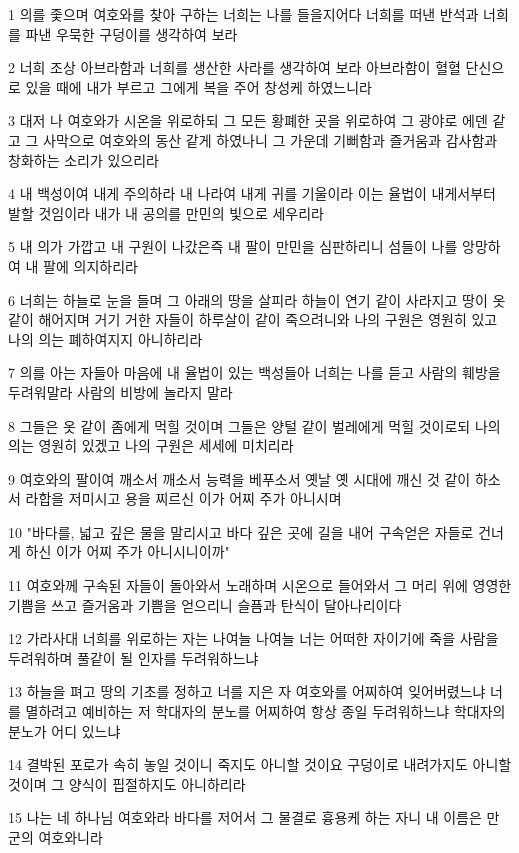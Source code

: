 \par 1 의를 좇으며 여호와를 찾아 구하는 너희는 나를 들을지어다 너희를 떠낸 반석과 너희를 파낸 우묵한 구덩이를 생각하여 보라
\par 2 너희 조상 아브라함과 너희를 생산한 사라를 생각하여 보라 아브라함이 혈혈 단신으로 있을 때에 내가 부르고 그에게 복을 주어 창성케 하였느니라
\par 3 대저 나 여호와가 시온을 위로하되 그 모든 황폐한 곳을 위로하여 그 광야로 에덴 같고 그 사막으로 여호와의 동산 같게 하였나니 그 가운데 기뻐함과 즐거움과 감사함과 창화하는 소리가 있으리라
\par 4 내 백성이여 내게 주의하라 내 나라여 내게 귀를 기울이라 이는 율법이 내게서부터 발할 것임이라 내가 내 공의를 만민의 빛으로 세우리라
\par 5 내 의가 가깝고 내 구원이 나갔은즉 내 팔이 만민을 심판하리니 섬들이 나를 앙망하여 내 팔에 의지하리라
\par 6 너희는 하늘로 눈을 들며 그 아래의 땅을 살피라 하늘이 연기 같이 사라지고 땅이 옷 같이 해어지며 거기 거한 자들이 하루살이 같이 죽으려니와 나의 구원은 영원히 있고 나의 의는 폐하여지지 아니하리라
\par 7 의를 아는 자들아 마음에 내 율법이 있는 백성들아 너희는 나를 듣고 사람의 훼방을 두려워말라 사람의 비방에 놀라지 말라
\par 8 그들은 옷 같이 좀에게 먹힐 것이며 그들은 양털 같이 벌레에게 먹힐 것이로되 나의 의는 영원히 있겠고 나의 구원은 세세에 미치리라
\par 9 여호와의 팔이여 깨소서 깨소서 능력을 베푸소서 옛날 옛 시대에 깨신 것 같이 하소서 라합을 저미시고 용을 찌르신 이가 어찌 주가 아니시며
\par 10 "바다를, 넓고 깊은 물을 말리시고 바다 깊은 곳에 길을 내어 구속얻은 자들로 건너게 하신 이가 어찌 주가 아니시니이까"
\par 11 여호와께 구속된 자들이 돌아와서 노래하며 시온으로 들어와서 그 머리 위에 영영한 기쁨을 쓰고 즐거움과 기쁨을 얻으리니 슬픔과 탄식이 달아나리이다
\par 12 가라사대 너희를 위로하는 자는 나여늘 나여늘 너는 어떠한 자이기에 죽을 사람을 두려워하며 풀같이 될 인자를 두려워하느냐
\par 13 하늘을 펴고 땅의 기초를 정하고 너를 지은 자 여호와를 어찌하여 잊어버렸느냐 너를 멸하려고 예비하는 저 학대자의 분노를 어찌하여 항상 종일 두려워하느냐 학대자의 분노가 어디 있느냐
\par 14 결박된 포로가 속히 놓일 것이니 죽지도 아니할 것이요 구덩이로 내려가지도 아니할 것이며 그 양식이 핍절하지도 아니하리라
\par 15 나는 네 하나님 여호와라 바다를 저어서 그 물결로 흉용케 하는 자니 내 이름은 만군의 여호와니라
